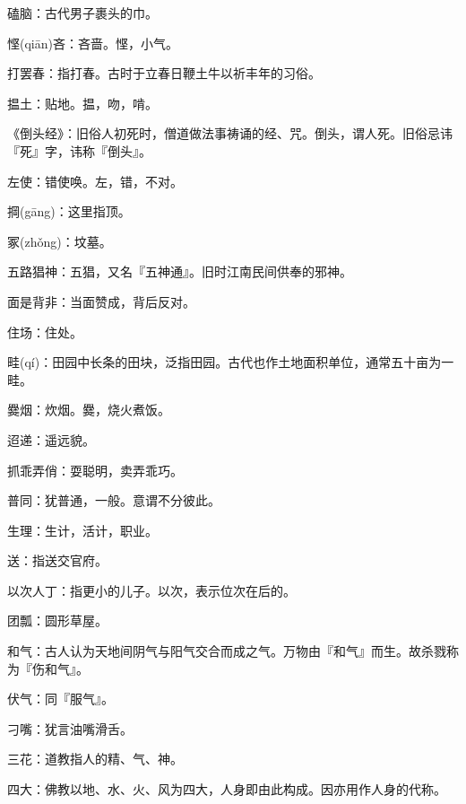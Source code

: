 \startbuffer[1700]
磕脑：古代男子裹头的巾。
\stopbuffer


\startbuffer[1701]
悭(qiān)吝：吝啬。悭，小气。
\stopbuffer


\startbuffer[1702]
打罢春：指打春。古时于立春日鞭土牛以祈丰年的习俗。
\stopbuffer


\startbuffer[1703]
揾土：贴地。揾，吻，啃。
\stopbuffer


\startbuffer[1704]
《倒头经》：旧俗人初死时，僧道做法事祷诵的经、咒。倒头，谓人死。旧俗忌讳『死』字，讳称『倒头』。
\stopbuffer


\startbuffer[1705]
左使：错使唤。左，错，不对。
\stopbuffer


\startbuffer[1706]
掆(gāng)：这里指顶。
\stopbuffer


\startbuffer[1707]
冢(zhǒng)：坟墓。
\stopbuffer


\startbuffer[1708]
五路猖神：五猖，又名『五神通』。旧时江南民间供奉的邪神。
\stopbuffer


\startbuffer[1709]
面是背非：当面赞成，背后反对。
\stopbuffer


\startbuffer[1710]
住场：住处。
\stopbuffer


\startbuffer[1711]
畦(qí)：田园中长条的田块，泛指田园。古代也作土地面积单位，通常五十亩为一畦。
\stopbuffer


\startbuffer[1712]
爨烟：炊烟。爨，烧火煮饭。
\stopbuffer


\startbuffer[1713]
迢递：遥远貌。
\stopbuffer


\startbuffer[1714]
抓乖弄俏：耍聪明，卖弄乖巧。
\stopbuffer


\startbuffer[1715]
普同：犹普通，一般。意谓不分彼此。
\stopbuffer


\startbuffer[1716]
生理：生计，活计，职业。
\stopbuffer


\startbuffer[1717]
送：指送交官府。
\stopbuffer


\startbuffer[1718]
以次人丁：指更小的儿子。以次，表示位次在后的。
\stopbuffer


\startbuffer[1719]
团瓢：圆形草屋。
\stopbuffer


\startbuffer[1720]
和气：古人认为天地间阴气与阳气交合而成之气。万物由『和气』而生。故杀戮称为『伤和气』。
\stopbuffer


\startbuffer[1721]
伏气：同『服气』。
\stopbuffer


\startbuffer[1722]
刁嘴：犹言油嘴滑舌。
\stopbuffer


\startbuffer[1723]
三花：道教指人的精、气、神。
\stopbuffer


\startbuffer[1724]
四大：佛教以地、水、火、风为四大，人身即由此构成。因亦用作人身的代称。
\stopbuffer


